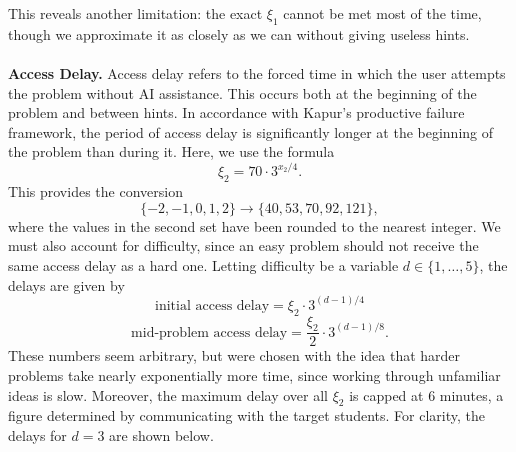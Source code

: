 \documentclass[12pt]{article}
\begin{document}
This reveals another limitation: the exact $\xi_1$ cannot be met most of the time, though we approximate it as closely as we can without giving useless hints.
\\\\
\textbf{Access Delay.} Access delay refers to the forced time in which the user attempts the problem without AI assistance. This occurs both at the beginning of the problem and between hints. In accordance with Kapur's productive failure framework, the period of access delay is significantly longer at the beginning of the problem than during it. Here, we use the formula
\[\xi_2 = 70 \cdot 3^{x_2/4}.\] This provides the conversion
\[\{-2, -1, 0, 1, 2\} \longrightarrow \{40, 53, 70, 92, 121\},\] where the values in the second set have been rounded to the nearest integer. We must also account for difficulty, since an easy problem should not receive the same access delay as a hard one. Letting difficulty be a variable $d \in \{1,\dots, 5\}$, the delays are given by
\[\text{initial access delay} = \xi_2 \cdot  3^{(d-1)/4}\]
\[\text{mid-problem access delay} = \frac {\xi_2}{2} \cdot 3^{(d-1)/8}.\]
These numbers seem arbitrary, but were chosen with the idea that harder problems take nearly exponentially more time, since working through unfamiliar ideas is slow. Moreover, the maximum delay over all $\xi_2$ is capped at $6$ minutes, a figure determined by communicating with the target students. For clarity, the delays for $d=3$ are shown below.
\end{document}
